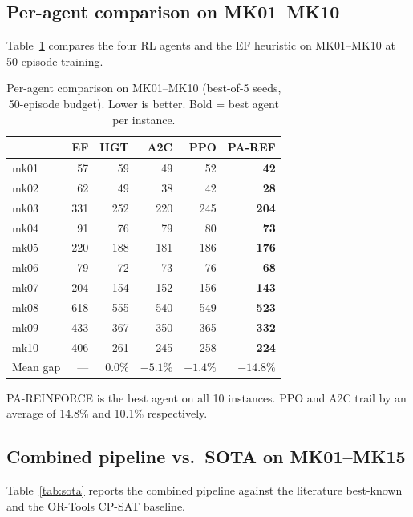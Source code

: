 \documentclass[preprint,review,3p,times,twocolumn]{elsarticle}
\begin{document}
\subsection{Per-agent comparison on MK01--MK10}

Table~\ref{tab:agents} compares the four RL agents and the
EF heuristic on MK01--MK10 at 50-episode training.

\begin{table}[t]
\centering
\caption{Per-agent comparison on MK01--MK10 (best-of-5
seeds, 50-episode budget). Lower is better. Bold = best
agent per instance.}
\label{tab:agents}
\small
\begin{tabular}{lrrrrr}
\toprule
& \textbf{EF} & \textbf{HGT} & \textbf{A2C} & \textbf{PPO} & \textbf{PA-REF} \\
\midrule
mk01 & 57 & 59 & 49 & 52 & \textbf{42} \\
mk02 & 62 & 49 & 38 & 42 & \textbf{28} \\
mk03 & 331 & 252 & 220 & 245 & \textbf{204} \\
mk04 & 91 & 76 & 79 & 80 & \textbf{73} \\
mk05 & 220 & 188 & 181 & 186 & \textbf{176} \\
mk06 & 79 & 72 & 73 & 76 & \textbf{68} \\
mk07 & 204 & 154 & 152 & 156 & \textbf{143} \\
mk08 & 618 & 555 & 540 & 549 & \textbf{523} \\
mk09 & 433 & 367 & 350 & 365 & \textbf{332} \\
mk10 & 406 & 261 & 245 & 258 & \textbf{224} \\
\midrule
Mean gap & --- & 0.0\% & $-5.1\%$ & $-1.4\%$ & $-14.8\%$ \\
\bottomrule
\end{tabular}
\end{table}

PA-REINFORCE is the best agent on all 10 instances. PPO and
A2C trail by an average of 14.8\% and 10.1\% respectively.

\subsection{Combined pipeline vs.\ SOTA on MK01--MK15}

Table~\ref{tab:sota} reports the combined pipeline against
the literature best-known and the OR-Tools CP-SAT baseline.
\end{document}
